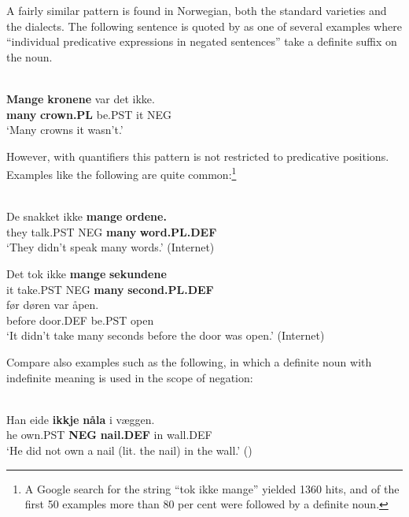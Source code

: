 A fairly similar pattern is found in Norwegian, both the standard varieties and the dialects. The following sentence is quoted by \citet[302]{FaarlundEtAl1997} as one of several examples where “individual predicative expressions in negated sentences” take a definite suffix on the noun. 

\ea \label{} 
\\
\gll \textbf{Mange} \textbf{  kronene} var  det  ikke.\\
\textbf{many} \textbf{crown.PL} be.PST  it  NEG\\
\glt ‘Many crowns it wasn’t.’

\z

However, with quantifiers this pattern is not restricted to predicative positions. Examples like the following are quite common:\footnote{ A Google search for the string “tok ikke mange” yielded 1360 hits, and of the first 50 examples more than 80 per cent were followed by a definite noun.}

\ea\label{}
\\
\gll De  snakket  ikke   \textbf{mange} \textbf{  ordene.}\\ %
		they  talk.PST  NEG  \textbf{many} \textbf{word.PL.DEF}\\
\glt ‘They didn’t speak many words.’ (Internet)

\z

\ea
\gll Det  tok  ikke  \textbf{mange} \textbf{sekundene}\\ %
it  take.PST  NEG  \textbf{many} \textbf{second.PL.DEF}\\
\gll før  døren  var  åpen.\\
before  door.DEF  be.PST  open\\
\glt  ‘It didn’t take many seconds before the door was open.’ (Internet)

\z

Compare also examples such as the following, in which a definite noun with indefinite meaning is used in the scope of negation:

\ea \label{} 
\\
\gll Han  eide  \textbf{ikkje} \textbf{nåla} i  væggen.\\
he  own.PST  \textbf{NEG} \textbf{nail.DEF} in  wall.DEF\\
\glt ‘He did not own a nail (lit. the nail) in the wall.’ (\citet[18]{Iversen1918})

